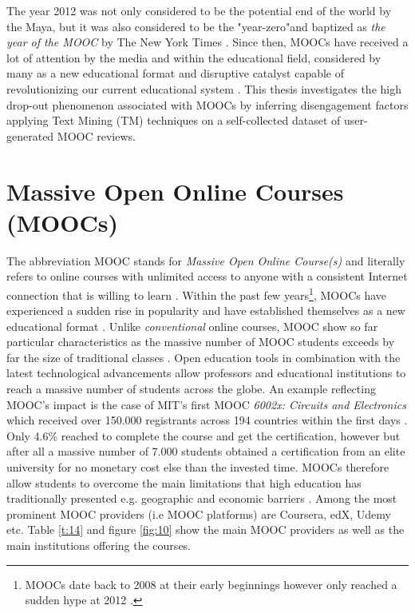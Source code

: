 \documentclass[
	a4paper,
	pdftex,
	12pt,	
	footinclude=true,
	fleqn,
	final,
	]{report}%
\begin{document}
The year 2012 was not only considered to be the potential end of the world by the Maya, but it was 
also considered to be the "year-zero"and baptized as \emph{the year of the MOOC} by The New York 
Times \cite{Times2012}. Since then, MOOCs have received a lot of attention by the 
media and within the educational field, considered by many as a new educational 
format and disruptive catalyst capable of revolutionizing our current educational 
system \cite{Christensen2013}. This thesis investigates the high drop-out phenomenon 
associated with MOOCs by inferring disengagement factors applying Text Mining (TM) 
techniques on a self-collected dataset of user-generated MOOC reviews. 
\vspace{-0.45cm}
\section{Massive Open Online Courses (MOOCs)}
\label{sec:intro_mooc}
\vspace{-0.3cm}

The abbreviation MOOC stands for \emph{Massive Open Online Course(s)} and literally refers to 
online courses with unlimited access to anyone
with a consistent Internet connection that is willing to learn \cite{Open2014}. 
Within the past few years\footnote{MOOCs date back to 2008 at their early beginnings however only reached a sudden hype at 
2012 \cite{Haggard2013}.}, MOOCs have experienced a sudden rise in popularity and have 
established themselves as a new educational format \cite{Hayes2015}. Unlike \emph{conventional} 
online courses, MOOC show so far particular characteristics as the massive number of MOOC students 
exceeds by far the size of traditional classes \cite{Koller2013}. Open education tools in 
combination with the latest technological advancements allow professors and educational 
institutions to reach a massive number of students across the globe. An example reflecting MOOC's
impact is the case of MIT's first MOOC \emph{6002x: Circuits and Electronics} 
which received over 150.000 registrants across 194 countries within the first days \cite{Ho2013a}. 
Only 4.6\% reached to complete the course and get the certification, however but after all
a massive number of 7.000 students obtained a certification from an elite university for 
no monetary cost else than the invested time. MOOCs therefore allow students to overcome the main
limitations that high education has traditionally presented e.g. geographic and economic barriers \cite{Russell2013}.
Among the most prominent MOOC providers (i.e MOOC platforms) are Coursera, edX, Udemy etc. 
Table \ref{t:14} and figure \ref{fig:10} show the main MOOC providers as well as 
the main institutions offering the courses.
\end{document}
